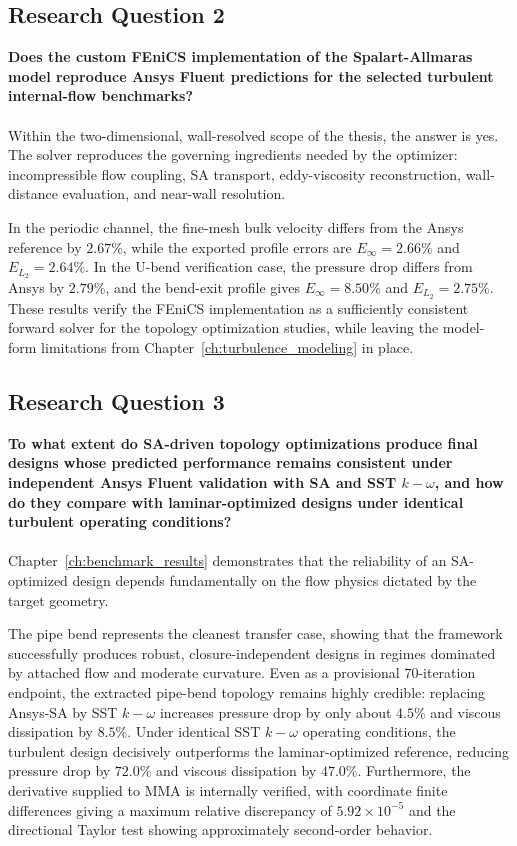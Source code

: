 \subsection*{Research Question 2}
 \textbf{Does the custom FEniCS implementation of the Spalart-Allmaras model reproduce Ansys Fluent predictions for the selected turbulent internal-flow benchmarks?}
 \\ \\
 Within the two-dimensional, wall-resolved scope of the thesis, the answer is yes. The solver reproduces the governing ingredients needed by the optimizer: incompressible flow coupling, SA transport, eddy-viscosity reconstruction, wall-distance evaluation, and near-wall resolution.

In the periodic channel, the fine-mesh bulk velocity differs from the Ansys reference by $2.67\%$, while the exported profile errors are $E_{\infty}=2.66\%$ and $E_{L_2}=2.64\%$. In the U-bend verification case, the pressure drop differs from Ansys by $2.79\%$, and the bend-exit profile gives $E_{\infty}=8.50\%$ and $E_{L_2}=2.75\%$. These results verify the FEniCS implementation as a sufficiently consistent forward solver for the topology optimization studies, while leaving the model-form limitations from Chapter~\ref{ch:turbulence_modeling} in place.

\subsection*{Research Question 3}
\textbf{To what extent do SA-driven topology optimizations produce final designs whose predicted performance remains consistent under independent Ansys Fluent validation with SA and SST $k-\omega$, and how do they compare with laminar-optimized designs under identical turbulent operating conditions?}
\\ \\
Chapter~\ref{ch:benchmark_results} demonstrates that the reliability of an SA-optimized design depends fundamentally on the flow physics dictated by the target geometry.

The pipe bend represents the cleanest transfer case, showing that the framework successfully produces robust, closure-independent designs in regimes dominated by attached flow and moderate curvature. Even as a provisional $70$-iteration endpoint, the extracted pipe-bend topology remains highly credible: replacing Ansys-SA by SST $k-\omega$ increases pressure drop by only about $4.5\%$ and viscous dissipation by $8.5\%$. Under identical SST $k-\omega$ operating conditions, the turbulent design decisively outperforms the laminar-optimized reference, reducing pressure drop by $72.0\%$ and viscous dissipation by $47.0\%$. Furthermore, the derivative supplied to MMA is internally verified, with coordinate finite differences giving a maximum relative discrepancy of $5.92\times10^{-5}$ and the directional Taylor test showing approximately second-order behavior.

